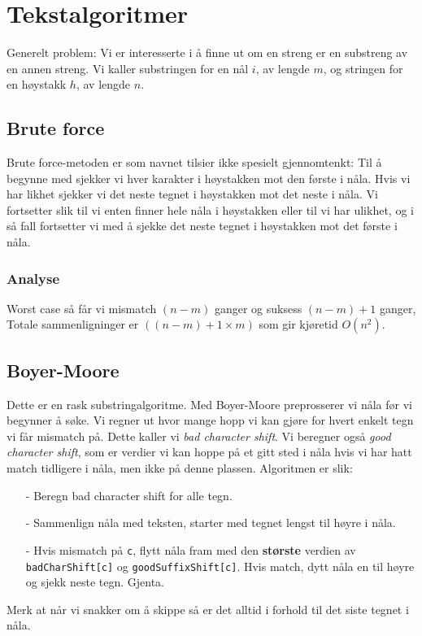 \section{\color{red}Tekstalgoritmer}
	Generelt problem: Vi er interesserte i å finne ut om en streng er en substreng av en annen streng. Vi kaller substringen for en nål $i$, av lengde $m$, og stringen for en høystakk $h$, av lengde $n$.

	\subsection{Brute force}
		Brute force-metoden er som navnet tilsier ikke spesielt gjennomtenkt: Til å begynne med sjekker vi hver karakter i høystakken mot den første i nåla. Hvis vi har likhet sjekker vi det neste tegnet i høystakken mot det neste i nåla. Vi fortsetter slik til vi enten finner hele nåla i høystakken eller til vi har ulikhet, og i så fall fortsetter vi med å sjekke det neste tegnet i høystakken mot det første i nåla.

	\subsubsection{Analyse}
		Worst case så får vi mismatch $(n-m)$ ganger og suksess $(n-m)+1$ ganger, Totale sammenligninger er $((n-m)+1\times m)$ som gir kjøretid $O(n^2)$.

	\subsection{\color{red}Boyer-Moore}
		Dette er en rask substringalgoritme. Med Boyer-Moore preprosserer vi nåla før vi begynner å søke. Vi regner ut hvor mange hopp vi kan gjøre for hvert enkelt tegn vi får mismatch på. Dette kaller vi \textit{bad character shift}. Vi beregner også \textit{good character shift}, som er verdier vi kan hoppe på et gitt sted i nåla hvis vi har hatt match tidligere i nåla, men ikke på denne plassen. \newline Algoritmen er slik:
		\begin{itemize}
			\item[-] Beregn bad character shift for alle tegn.
			\item[-] Sammenlign nåla med teksten, starter med tegnet lengst til høyre i nåla.
			\item[-] Hvis mismatch på \verb|c|, flytt nåla fram med den \textbf{største} verdien av \verb|badCharShift[c]| og \verb|goodSuffixShift[c]|. Hvis match, dytt nåla en til høyre og sjekk neste tegn. Gjenta.
		\end{itemize}
		Merk at når vi snakker om å skippe så er det alltid i forhold til det siste tegnet i nåla.

